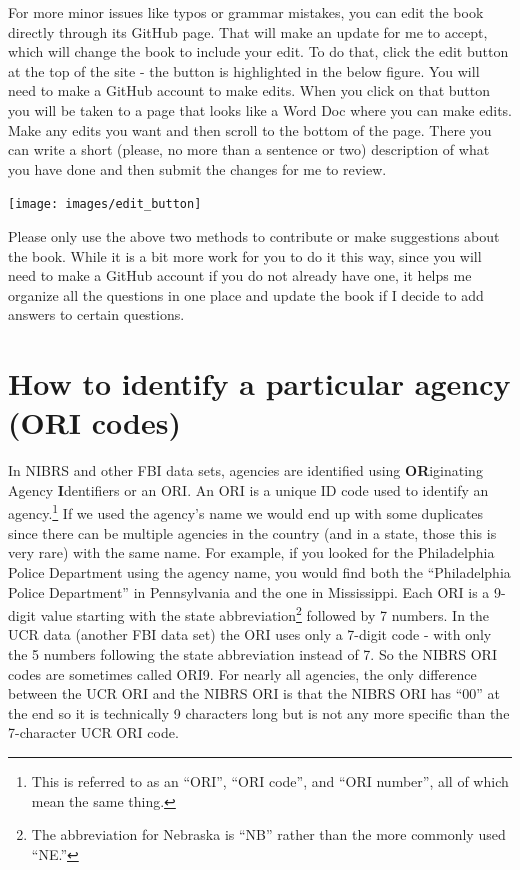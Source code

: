 \documentclass[
]{krantz}
\let\origfigure\figure
\let\endorigfigure\endfigure
\renewenvironment{figure}[1][2] {
    \expandafter\origfigure\expandafter[H]
} {
    \endorigfigure
}
\begin{document}
For more minor issues like typos or grammar mistakes, you
can edit the book directly through its GitHub page. That
will make an update for me to accept, which will change the
book to include your edit. To do that, click the edit button
at the top of the site - the button is highlighted in the
below figure. You will need to make a GitHub account to make
edits. When you click on that button you will be taken to a
page that looks like a Word Doc where you can make edits.
Make any edits you want and then scroll to the bottom of the
page. There you can write a short (please, no more than a
sentence or two) description of what you have done and then
submit the changes for me to review.

\begin{figure}

{\centering \texttt{[image: images/edit\_button]} 

}

\caption{The edit button for how to make edits of this book.}\label{fig:unnamed-chunk-3}
\end{figure}

Please only use the above two methods to contribute or make
suggestions about the book. While it is a bit more work for
you to do it this way, since you will need to make a GitHub
account if you do not already have one, it helps me organize
all the questions in one place and update the book if I
decide to add answers to certain questions.

\section{How to identify a particular agency (ORI
codes)}\label{ori}

In NIBRS and other FBI data sets, agencies are identified
using \textbf{OR}iginating Agency \textbf{I}dentifiers or an
ORI. An ORI is a unique ID code used to identify an
agency.\footnote{This is referred to as an ``ORI'', ``ORI
  code'', and ``ORI number'', all of which mean the same
  thing.} If we used the agency's name we would end up with
some duplicates since there can be multiple agencies in the
country (and in a state, those this is very rare) with the
same name. For example, if you looked for the Philadelphia
Police Department using the agency name, you would find both
the ``Philadelphia Police Department'' in Pennsylvania and
the one in Mississippi. Each ORI is a 9-digit value starting
with the state abbreviation\footnote{The abbreviation for
  Nebraska is ``NB'' rather than the more commonly used
  ``NE.''} followed by 7 numbers. In the UCR data (another
FBI data set) the ORI uses only a 7-digit code - with only
the 5 numbers following the state abbreviation instead of 7.
So the NIBRS ORI codes are sometimes called ORI9. For nearly
all agencies, the only difference between the UCR ORI and
the NIBRS ORI is that the NIBRS ORI has ``00'' at the end so
it is technically 9 characters long but is not any more
specific than the 7-character UCR ORI code.
\end{document}
